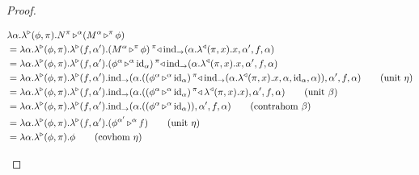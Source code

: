 \documentclass{llncs}
\begin{document}
\begin{proof}
\begin{itemize}
\begin{align*}
      &\lambdaunary {\alpha} {\phi} \pi \appunary N {\pi} {({\appunary M \alpha \phi \pi})} {\alpha}\\
      &= \lambdaunary {\alpha} {\phi} \pi \homrlambdaXatYdotZ {f}{\alpha'} {\homlappXtoYatZ {\punitelimkontZatABC {\alpha. \homllambdaXatYdotZ x \pi x} {\alpha'} f {\alpha}} {({\appunary M \alpha \phi \pi})} \pi}\\
      &= \lambdaunary {\alpha} {\phi} \pi \homrlambdaXatYdotZ {f}{\alpha'} {\homlappXtoYatZ {\punitelimkontZatABC {\alpha. \homllambdaXatYdotZ x \pi x} {\alpha'} f {\alpha}} {(\appunary \phi \alpha {\punitrefl\alpha}{\alpha})} \pi}\\ 
      &= \lambdaunary {\alpha} {\phi} \pi \homrlambdaXatYdotZ {f}{\alpha'} \punitelimkontZatABC {\alpha. ({\homlappXtoYatZ {\punitelimkontZatABC {\alpha. \homllambdaXatYdotZ x \pi x} {\alpha} {\punitrefl \alpha} {\alpha}} {(\appunary \phi \alpha {\punitrefl\alpha}{\alpha})} \pi})} {\alpha'}{f}{\alpha}\tag{unit $\eta$}
      \\ 
      &= \lambdaunary {\alpha} {\phi} \pi \homrlambdaXatYdotZ {f}{\alpha'} \punitelimkontZatABC {\alpha. ({\homlappXtoYatZ {\homllambdaXatYdotZ x \pi x} {(\appunary \phi \alpha {\punitrefl\alpha}{\alpha})} \pi})} {\alpha'}{f}{\alpha}\tag{unit $\beta$} \\ 
      &= \lambdaunary {\alpha} {\phi} \pi \homrlambdaXatYdotZ {f}{\alpha'} \punitelimkontZatABC {\alpha. ({{(\appunary \phi \alpha {\punitrefl\alpha}{\alpha})}})} {\alpha'}{f}{\alpha}\tag{contrahom $\beta$} \\ 
      &= \lambdaunary {\alpha} {\phi} \pi \homrlambdaXatYdotZ {f}{\alpha'} {{(\appunary \phi {\alpha'} f {\alpha})}}\tag{unit $\eta$} \\ 
      &= \lambdaunary {\alpha} {\phi} \pi \phi \tag{covhom $\eta$} \\ 
    \end{align*}
  \end{itemize}
\end{proof}
\end{document}
